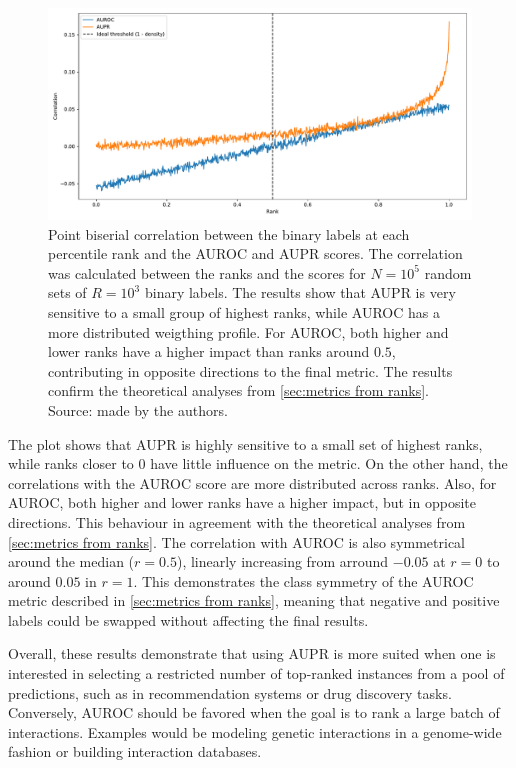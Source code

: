 \begin{figure}[bth]
    \includegraphics[width=\textwidth]{
        experiments/theoretical_scoring/results/rank_correlation.pdf
    }
    \caption{
        Point biserial correlation between the binary labels at each percentile rank and the AUROC and AUPR scores. The correlation was calculated between the ranks and the scores for $N=10^5$ random sets of $R=10^3$ binary labels. The results show that AUPR is very sensitive to a small group of highest ranks, while AUROC has a more distributed weigthing profile. For AUROC, both higher and lower ranks have a higher impact than ranks around $0.5$, contributing in opposite directions to the final metric. The results confirm the theoretical analyses from \autoref{sec:metrics from ranks}. Source: made by the authors.
    }
    \label{fig:correlation ranks}
\end{figure}

The plot shows that AUPR is highly sensitive to a small set of highest ranks, while ranks closer to $0$ have little influence on the metric. On the other hand, the correlations with the AUROC score are more distributed across ranks. Also, for AUROC, both higher and lower ranks have a higher impact, but in opposite directions.
This behaviour in agreement with the theoretical analyses from \autoref{sec:metrics from ranks}.
The correlation with AUROC is also symmetrical around the median ($r=0.5$), linearly increasing from arround $-0.05$ at $r=0$ to around $0.05$ in $r=1$. This demonstrates the class symmetry of the AUROC metric described in \autoref{sec:metrics from ranks}, meaning that negative and positive labels could be swapped without affecting the final results.

Overall, these results demonstrate that using AUPR is more suited when one is interested in selecting a restricted number of top-ranked instances from a pool of predictions, such as in recommendation systems or drug discovery tasks.
Conversely, AUROC should be favored when the goal is to rank a large batch of interactions. Examples would be modeling genetic interactions in a genome-wide fashion or building interaction databases.

